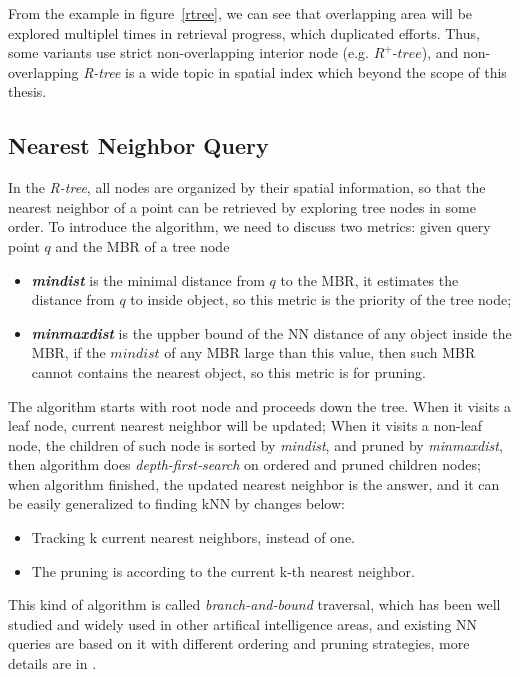 From the example in figure~\ref{rtree}, we can see that overlapping area will be explored
multiplel times in retrieval progress, which duplicated efforts.
Thus, some variants use strict non-overlapping interior node (e.g.
$R^+\textit{-tree}$\cite{sellis1987r+}), and non-overlapping \textit{R-tree} is a wide topic in
spatial index which beyond the scope of this thesis.

\subsection{Nearest Neighbor Query}
In the \textit{R-tree}, all nodes are organized by their spatial information,
so that the nearest neighbor of a point can be retrieved by exploring tree nodes in some order.
To introduce the algorithm, we need to discuss two metrics: given query point $q$ and the MBR of a tree node
\begin{itemize}
  \item \textit{\textbf{mindist}} is the minimal distance from $q$ to the MBR, it estimates the
    distance from $q$ to inside object, so this metric is the priority of the tree node;
  \item \textit{\textbf{minmaxdist}} is the uppber bound of the NN distance of any object inside
    the MBR, if the $mindist$ of any MBR large than this value, then such MBR cannot contains
    the nearest object, so this metric is for pruning.
\end{itemize}
The algorithm starts with root node and proceeds down the tree. When it visits a leaf node,
current nearest neighbor will be updated;
When it visits a non-leaf node, the children of such node is sorted by \textit{mindist}, and pruned by
\textit{minmaxdist}, then algorithm does \textit{depth-first-search} on ordered and pruned children nodes;
when algorithm finished, the updated nearest neighbor is the answer, and it can be easily
generalized to finding kNN by changes below:
\begin{itemize}
  \item  Tracking k current nearest neighbors, instead of one.
  \item  The pruning is according to the current k-th nearest neighbor.
\end{itemize}

This kind of algorithm is called \textit{branch-and-bound} traversal, which has been well
studied and widely used in other artifical intelligence areas\cite{sellis1987r+},
and existing NN queries are based on it with different ordering and pruning strategies,
more details are in \cite{roussopoulos1995nearest,cheung1998enhanced}.

